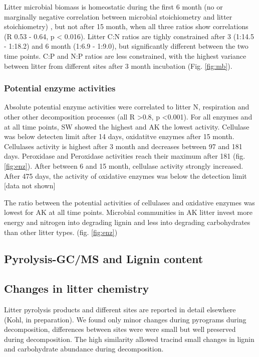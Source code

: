 \documentclass[authoryear,preprint,review,12pt]{elsarticle}
\begin{document}
Litter microbial biomass is homeostatic during the first 6 month (no or marginally negative correlation between microbial stoichiometry and litter stoichiometry) \citep{Mooshammer2011}, but not after 15 month, when all three ratios show correlations (R 0.53 - 0.64, p < 0.016). Litter C:N ratios are tighly constrained after 3 (1:14.5 - 1:18.2) and 6 month (1:6.9 - 1:9.0), but significantly different between the two time points. C:P and N:P ratios are less constrained, with the highest variance between litter from different sites after 3 month incubation (Fig. \ref{fig:mb}).

\subsubsection{Potential enzyme activities}
Absolute potential enzyme activities were correlated to litter N, respiration and other other decomposition processes (all R \textgreater  0.8, p \textless 0.001). For all enzymes and at all time points, SW showed the highest and AK the lowest activity. Cellulase was below detecten limit after 14 days, oxidatitve enzymes after 15 month. Cellulases activity is highest after 3 month and decreases between 97 and 181 days. Peroxidase and Peroxidase activities reach their maximum after 181 (fig. \ref{fig:enz}). After between 6 and 15 month, cellulase activity strongly increased. After 475 days, the activity of oxidative enzymes was below the detection limit [data not shown]

The ratio between the potential activities of cellulases and oxidative enzymes was lowest for AK at all time points. Microbial communities in AK litter invest more energy and nitrogen into degrading lignin and less into degrading carbohydrates than other litter types. (fig. \ref{fig:enz})

\subsection{Pyrolysis-GC/MS and Lignin content}
\subsection{Changes in litter chemistry}

Litter pyrolysis products and different sites are reported in detail elsewhere (Kohl, in preparation). We found only minor changes during pyrograms during decomposition, differences between sites were were small but well preserved during decomposition. The high similarity allowed tracind small changes in lignin and carbohydrate abundance during decomposition. %
\end{document}

